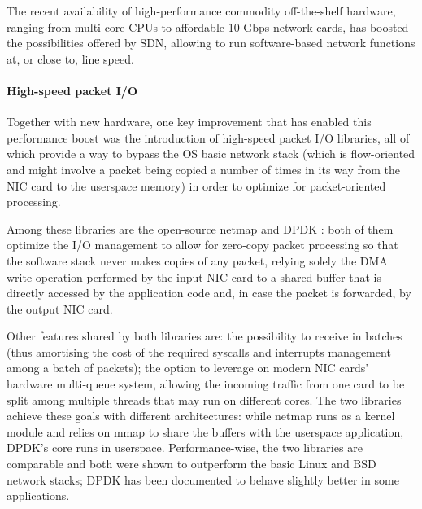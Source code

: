 \documentclass[12pt,a4paper,twoside]{book}
\begin{document}
The recent availability of high-performance
commodity off-the-shelf
hardware, ranging from multi-core CPUs to affordable 10 Gbps network cards, has boosted the possibilities offered by \gls{SDN}, allowing to run software-based network functions at, or close to, line speed.

\paragraph{High-speed packet I/O} Together with new hardware, one key improvement that has enabled this performance boost was the introduction of high-speed packet I/O libraries, all of which provide a way to bypass the OS basic network stack (which is flow-oriented and might involve a packet being copied a number of times in its way from the NIC card to the userspace memory) in order to optimize for packet-oriented processing.

Among these libraries are the open-source netmap\cite{netmap} and DPDK\cite{dpdk}
: both of them optimize the I/O management to allow for zero-copy packet processing so that the software stack never makes copies of any packet, relying solely the DMA write operation performed by the input NIC card to a shared buffer that is directly accessed by the application code and, in case the packet is forwarded, by the output NIC card.

Other features shared by both libraries are:
the possibility to receive in batches (thus amortising the cost of the required syscalls and interrupts management among a batch of packets);
the option to leverage on modern NIC cards' hardware multi-queue system, allowing the incoming traffic from one card to be split among multiple threads that may run on different cores. The two libraries achieve these goals with different architectures: while netmap runs as a kernel module and relies on mmap to share the buffers with the userspace application, DPDK's core runs in userspace.
Performance-wise, the two libraries are comparable and both were shown to outperform the basic Linux and BSD network stacks; DPDK has been documented to behave slightly better in some applications\cite{fastclick}.
\end{document}
